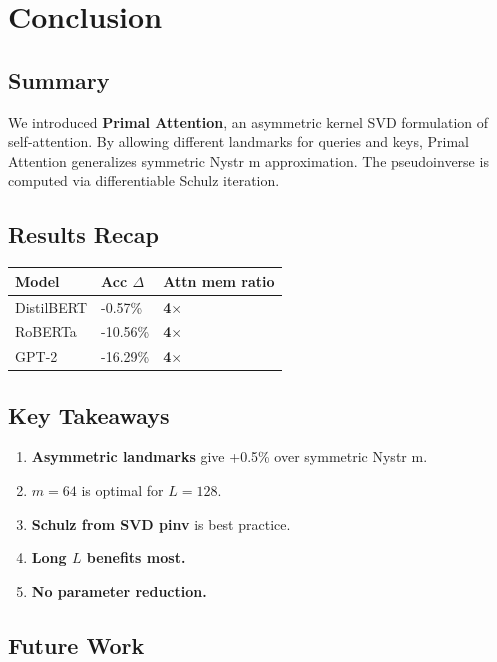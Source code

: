 
\section{Conclusion}

\subsection{Summary}

We introduced \textbf{Primal Attention}, an asymmetric kernel SVD formulation 
of self-attention. By allowing different landmarks for queries and keys, 
Primal Attention generalizes symmetric Nystr m approximation. The pseudoinverse 
is computed via differentiable Schulz iteration.

\subsection{Results Recap}

\begin{table}[H]
\centering
\small
\begin{tabular}{lll}
\toprule
\textbf{Model} & \textbf{Acc $\Delta$} & \textbf{Attn mem ratio} \\
\midrule
DistilBERT & -0.57\% & \textbf{4$\times$} \\
RoBERTa & -10.56\% & \textbf{4$\times$} \\
GPT-2 & -16.29\% & \textbf{4$\times$} \\
\bottomrule
\end{tabular}
\end{table}

\subsection{Key Takeaways}

\begin{enumerate}
\item \textbf{Asymmetric landmarks} give +0.5\% over symmetric Nystr m.
\item \textbf{$m = 64$} is optimal for $L = 128$.
\item \textbf{Schulz from SVD pinv} is best practice.
\item \textbf{Long $L$ benefits most.}
\item \textbf{No parameter reduction.}

\end{enumerate}
\subsection{Future Work}

